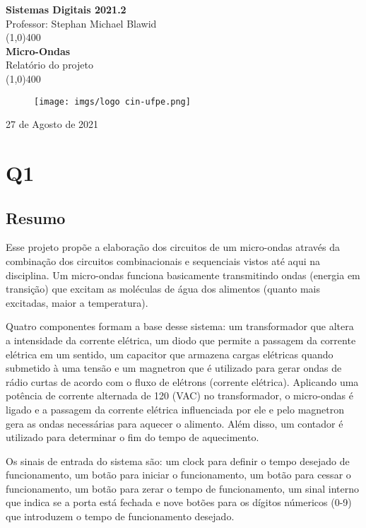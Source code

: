 \documentclass[12pt]{article}
\begin{document}
\begin{titlepage}
\begin{center}
\vspace*{1cm}
\Large{\textbf{Sistemas Digitais 2021.2}\\Professor: Stephan Michael Blawid}\\
\vfill
\line(1,0){400}\\[1mm]
\huge{\textbf{Micro-Ondas}}\\[3mm]
\Large{Relatório do projeto}\\[1mm]
\line(1,0){400}
\vfill
\begin{figure}[!htb]
    \centering
    \texttt{[image: imgs/logo cin-ufpe.png]}\\
    \label{fig:logo}
\end{figure}
27 de Agosto de 2021
\end{center}
\end{titlepage}

\setcounter{page}{1}

\section*{Q1}

\subsection*{Resumo}

Esse projeto propõe a elaboração dos circuitos de um micro-ondas através da combinação dos circuitos combinacionais e sequenciais vistos até aqui na disciplina. Um micro-ondas funciona basicamente transmitindo ondas (energia em transição) que excitam as moléculas de água dos alimentos (quanto mais excitadas, maior a temperatura).


Quatro componentes formam a base desse sistema: um transformador que altera a intensidade da corrente elétrica, um diodo que permite a passagem da corrente elétrica em um sentido, um capacitor que armazena cargas elétricas quando submetido à uma tensão e um magnetron que é utilizado para gerar ondas de rádio curtas de acordo com o fluxo de elétrons (corrente elétrica). Aplicando uma potência de corrente alternada de 120 (VAC) no transformador, o micro-ondas é ligado e a passagem da corrente elétrica influenciada por ele e pelo magnetron gera as ondas necessárias para aquecer o alimento. Além disso, um contador é utilizado para determinar o fim do tempo de aquecimento.


Os sinais de entrada do sistema são: um clock para definir o tempo desejado de  funcionamento, um botão para iniciar o funcionamento, um botão para cessar o funcionamento, um botão para zerar o tempo de funcionamento, um sinal interno que indica se a porta está fechada e nove botões para os dígitos númericos (0-9) que introduzem o tempo de funcionamento desejado.
\end{document}
